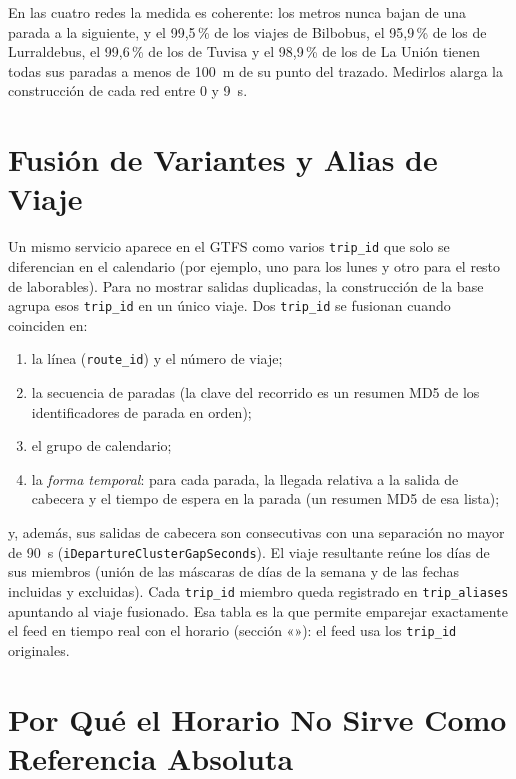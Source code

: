 En las cuatro redes la medida es coherente: los metros nunca bajan de una parada a la siguiente, y el 99,5\,\% de los
viajes de Bilbobus, el 95,9\,\% de los de Lurraldebus, el 99,6\,\% de los de Tuvisa y el 98,9\,\% de los de La Unión
tienen todas sus paradas a menos de 100~m de su punto del trazado. Medirlos alarga la construcción de cada
red entre 0 y 9~s.

\section{Fusión de Variantes y Alias de Viaje}
\label{sec:alias}

Un mismo servicio aparece en el GTFS como varios \texttt{trip\_id} que solo se diferencian en el calendario (por
ejemplo, uno para los lunes y otro para el resto de laborables). Para no mostrar salidas duplicadas, la construcción
de la base agrupa esos \texttt{trip\_id} en un único viaje. Dos \texttt{trip\_id} se fusionan cuando coinciden en:

\begin{enumerate}
  \item la línea (\texttt{route\_id}) y el número de viaje;
  \item la secuencia de paradas (la clave del recorrido es un resumen MD5 de los identificadores de parada en orden);
  \item el grupo de calendario;
  \item la \emph{forma temporal}: para cada parada, la llegada relativa a la salida de cabecera y el tiempo de espera
        en la parada (un resumen MD5 de esa lista);
\end{enumerate}

\noindent y, además, sus salidas de cabecera son consecutivas con una separación no mayor de 90~s
(\texttt{iDepartureClusterGapSeconds}). El viaje resultante reúne los días de sus miembros (unión de las máscaras de
días de la semana y de las fechas incluidas y excluidas). Cada \texttt{trip\_id} miembro queda registrado en
\texttt{trip\_aliases} apuntando al viaje fusionado. Esa tabla es la que permite emparejar exactamente el feed en
tiempo real con el horario (sección «»): el feed usa los \texttt{trip\_id} originales.

\section{Por Qué el Horario No Sirve Como Referencia Absoluta}
\label{sec:interpolado}

